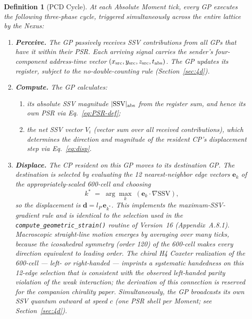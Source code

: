 \documentclass[12pt]{article}
\newtheorem{definition}[theorem]{Definition}
\begin{document}
\begin{definition}[PCD Cycle]
\label{def:pcd}
At each Absolute Moment tick, every GP executes the following three-phase
cycle, triggered simultaneously across the entire lattice by the Nexus:

\begin{enumerate}[label=\textbf{\Alph*.}]
  \item \textbf{Perceive.}  The GP passively receives SSV contributions from
    all GPs that have it within their PSR.  Each arriving signal carries the
    sender's four-component address-time vector
    $(x_{\rm src},y_{\rm src},z_{\rm src},t_{\rm abs})$.  The GP updates its
    register, subject to the no-double-counting rule
    (Section~\ref{sec:4d}).

  \item \textbf{Compute.}  The GP calculates:
    \begin{enumerate}[label=(\roman*)]
      \item its absolute SSV magnitude $|\text{SSV}|_{\rm abs}$ from the
        register sum, and hence its own PSR via Eq.~\eqref{eq:PSR-def};
      \item the net SSV vector $V_i$ (vector sum over all
        received contributions), which determines the direction and magnitude
        of the resident CP's displacement step via Eq.~\eqref{eq:disp}.
    \end{enumerate}

  \item \textbf{Displace.}  The CP resident on this GP moves to its
    destination GP.  The destination is selected by evaluating the 12
    nearest-neighbor edge vectors $\mathbf{e}_k$ of the appropriately-scaled
    600-cell and choosing
    \begin{equation}
      k^* \;=\; \arg\max_k\;(\mathbf{e}_k \cdot \nabla\text{SSV}),
      \label{eq:argmax}
    \end{equation}
    so the displacement is $\mathbf{d} = l_P\,\mathbf{e}_{k^*}$.  This
    implements the maximum-SSV-gradient rule and is identical to the
    selection used in the \texttt{compute\_geometric\_strain()} routine of
    Version~16 (Appendix~A.8.1).  Macroscopic straight-line motion emerges
    by averaging over many ticks, because the icosahedral symmetry (order
    120) of the 600-cell makes every direction equivalent to leading order.
    The chiral H4 Coxeter realization of the 600-cell --- left- or
    right-handed --- imprints a systematic handedness on this 12-edge
    selection that is \emph{consistent with} the observed left-handed parity
    violation of the weak interaction; the derivation of this connection is
    reserved for the companion chirality paper.
    Simultaneously, the GP broadcasts its own SSV quantum outward at speed
    $c$ (one PSR shell per Moment; see Section~\ref{sec:4d}).
\end{enumerate}
\end{definition}
\end{document}
